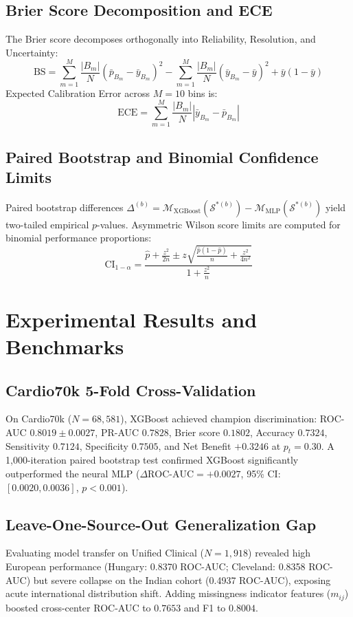 \documentclass[conference]{IEEEtran}
\begin{document}
\subsection{Brier Score Decomposition and ECE}
The Brier score decomposes orthogonally into Reliability, Resolution, and Uncertainty:
\begin{equation}
\mathrm{BS} = \sum_{m=1}^M \frac{|B_m|}{N} (\bar{p}_{B_m} - \bar{y}_{B_m})^2 - \sum_{m=1}^M \frac{|B_m|}{N} (\bar{y}_{B_m} - \bar{y})^2 + \bar{y}(1 - \bar{y})
\end{equation}
Expected Calibration Error across $M=10$ bins is:
\begin{equation}
\mathrm{ECE} = \sum_{m=1}^M \frac{|B_m|}{N} \left| \bar{y}_{B_m} - \bar{p}_{B_m} \right|
\end{equation}

\subsection{Paired Bootstrap and Binomial Confidence Limits}
Paired bootstrap differences $\Delta^{(b)} = \mathcal{M}_{\text{XGBoost}}(\mathcal{S}^{*(b)}) - \mathcal{M}_{\text{MLP}}(\mathcal{S}^{*(b)})$ yield two-tailed empirical $p$-values. Asymmetric Wilson score limits are computed for binomial performance proportions:
\begin{equation}
\mathrm{CI}_{1-\alpha} = \frac{\hat{p} + \frac{z^2}{2n} \pm z \sqrt{\frac{\hat{p}(1 - \hat{p})}{n} + \frac{z^2}{4n^2}}}{1 + \frac{z^2}{n}}
\end{equation}

\section{Experimental Results and Benchmarks}
\subsection{Cardio70k 5-Fold Cross-Validation}
On Cardio70k ($N = 68,581$), XGBoost achieved champion discrimination: ROC-AUC $0.8019 \pm 0.0027$, PR-AUC $0.7828$, Brier score $0.1802$, Accuracy $0.7324$, Sensitivity $0.7124$, Specificity $0.7505$, and Net Benefit $+0.3246$ at $p_t = 0.30$. A 1,000-iteration paired bootstrap test confirmed XGBoost significantly outperformed the neural MLP ($\Delta\text{ROC-AUC} = +0.0027$, 95\% CI: $[0.0020, 0.0036]$, $p < 0.001$).

\subsection{Leave-One-Source-Out Generalization Gap}
Evaluating model transfer on Unified Clinical ($N = 1,918$) revealed high European performance (Hungary: 0.8370 ROC-AUC; Cleveland: 0.8358 ROC-AUC) but severe collapse on the Indian cohort (0.4937 ROC-AUC), exposing acute international distribution shift. Adding missingness indicator features ($m_{ij}$) boosted cross-center ROC-AUC to $0.7653$ and F1 to $0.8004$.
\end{document}
